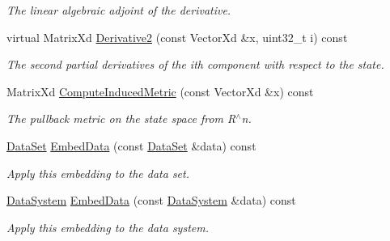 \begin{DoxyCompactItemize}
\begin{DoxyCompactList}\small\item\em The linear algebraic adjoint of the derivative. \end{DoxyCompactList}\item 
\hypertarget{struct_d_r_d_s_p_1_1_embedding_ae651c3ad18c8ad3dbbfea1577d7d395f}{virtual Matrix\-Xd \hyperlink{struct_d_r_d_s_p_1_1_embedding_ae651c3ad18c8ad3dbbfea1577d7d395f}{Derivative2} (const Vector\-Xd \&x, uint32\-\_\-t i) const }\label{struct_d_r_d_s_p_1_1_embedding_ae651c3ad18c8ad3dbbfea1577d7d395f}

\begin{DoxyCompactList}\small\item\em The second partial derivatives of the ith component with respect to the state. \end{DoxyCompactList}\item 
\hypertarget{struct_d_r_d_s_p_1_1_embedding_a5d28c64ee0aa19fb2481f16795b31765}{Matrix\-Xd \hyperlink{struct_d_r_d_s_p_1_1_embedding_a5d28c64ee0aa19fb2481f16795b31765}{Compute\-Induced\-Metric} (const Vector\-Xd \&x) const }\label{struct_d_r_d_s_p_1_1_embedding_a5d28c64ee0aa19fb2481f16795b31765}

\begin{DoxyCompactList}\small\item\em The pullback metric on the state space from R$^\wedge$n. \end{DoxyCompactList}\item 
\hypertarget{struct_d_r_d_s_p_1_1_embedding_a71acf702383901f9d4aa6fb198dc0892}{\hyperlink{struct_d_r_d_s_p_1_1_data_set}{Data\-Set} \hyperlink{struct_d_r_d_s_p_1_1_embedding_a71acf702383901f9d4aa6fb198dc0892}{Embed\-Data} (const \hyperlink{struct_d_r_d_s_p_1_1_data_set}{Data\-Set} \&data) const }\label{struct_d_r_d_s_p_1_1_embedding_a71acf702383901f9d4aa6fb198dc0892}

\begin{DoxyCompactList}\small\item\em Apply this embedding to the data set. \end{DoxyCompactList}\item 
\hypertarget{struct_d_r_d_s_p_1_1_embedding_abdf67b0ed050b58fc9a0943d604093ef}{\hyperlink{struct_d_r_d_s_p_1_1_data_system}{Data\-System} \hyperlink{struct_d_r_d_s_p_1_1_embedding_abdf67b0ed050b58fc9a0943d604093ef}{Embed\-Data} (const \hyperlink{struct_d_r_d_s_p_1_1_data_system}{Data\-System} \&data) const }\label{struct_d_r_d_s_p_1_1_embedding_abdf67b0ed050b58fc9a0943d604093ef}

\begin{DoxyCompactList}\small\item\em Apply this embedding to the data system. \end{DoxyCompactList}\end{DoxyCompactItemize}
